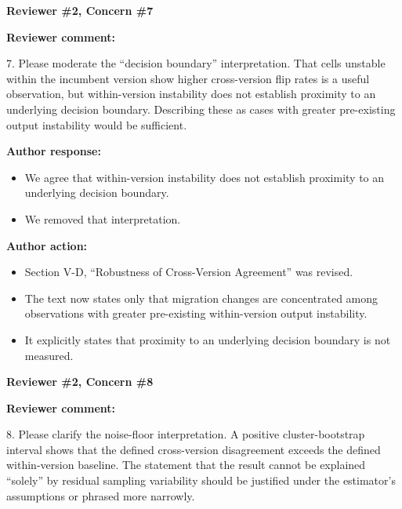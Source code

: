 \documentclass[11pt]{article}
\newcommand{\rvcomment}[1]{{\color{ReviewerGreen}#1}}
\newcommand{\concern}[1]{\textbf{\color{ReviewerGreen}#1}}
\begin{document}
\vspace{12pt}
\concern{Reviewer \#2, Concern \#7}

\concern{Reviewer comment:}

\rvcomment{7. Please moderate the ``decision boundary'' interpretation. That cells unstable within the incumbent version show higher cross-version flip rates is a useful observation, but within-version instability does not establish proximity to an underlying decision boundary. Describing these as cases with greater pre-existing output instability would be sufficient.}

\textbf{Author response:}

\begin{itemize}

\item We agree that within-version instability does not establish proximity to an underlying decision boundary.

\item We removed that interpretation.

\end{itemize}

\textbf{Author action:}

\begin{itemize}

\item Section V-D, ``Robustness of Cross-Version Agreement'' was revised.

\item The text now states only that migration changes are concentrated among observations with greater pre-existing within-version output instability.

\item It explicitly states that proximity to an underlying decision boundary is not measured.

\end{itemize}

\vspace{12pt}
\concern{Reviewer \#2, Concern \#8}

\concern{Reviewer comment:}

\rvcomment{8. Please clarify the noise-floor interpretation. A positive cluster-bootstrap interval shows that the defined cross-version disagreement exceeds the defined within-version baseline. The statement that the result cannot be explained ``solely'' by residual sampling variability should be justified under the estimator's assumptions or phrased more narrowly.}
\end{document}
